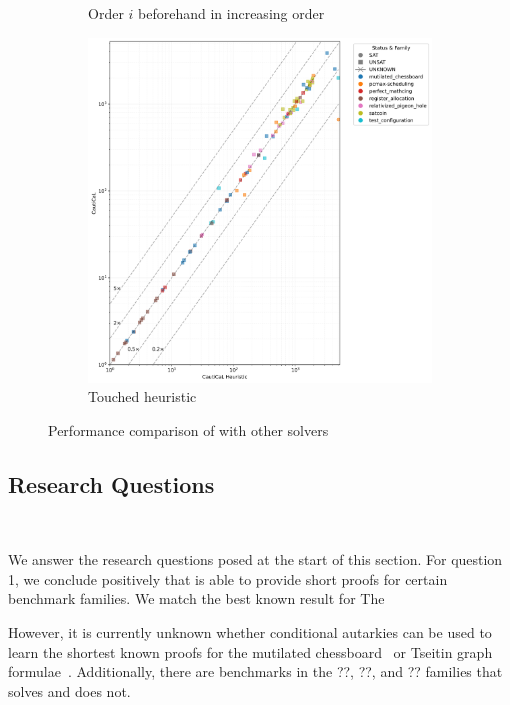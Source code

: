 \begin{figure}[!t]
\begin{subfigure}[t]{0.3\textwidth}
        \caption{Order $i$ beforehand in increasing order}
        \label{fig:cautical-vs-prelearn}
    \end{subfigure}
    \begin{subfigure}[t]{0.3\textwidth}
        \centering
        \includegraphics[width=\textwidth]{figs/globaltouch_heuristic_comparison.jpg}
        \caption{Touched heuristic}
        \label{fig:cautical-vs-prelearn}
    \end{subfigure}

    \caption{Performance comparison of \tool with other solvers}
\end{figure}


\subsection{Research Questions}~\label{subsec:eval-research-questions}

We answer the research questions posed at the start of this section. For
question 1, we conclude positively that \tool is able to provide short \pr
proofs for certain benchmark families. We match the best known result for The

However, it is currently unknown whether conditional autarkies can be used to
learn the shortest known \pr proofs for the mutilated
chessboard~\cite{mutilatedchessboard-pr} or Tseitin graph
formulae~\cite{sadical}. Additionally, there are benchmarks in the ??, ??, and
?? families that \prelearn solves and \tool does not.

